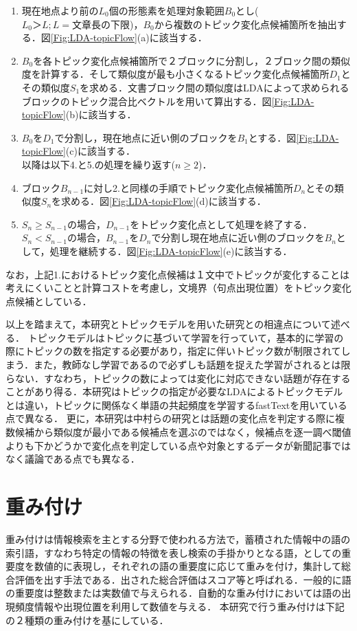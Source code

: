 \begin{enumerate}
  \item 現在地点より前の$L_0$個の形態素を処理対象範囲$B_0$とし($L_0＞L;L=文章長の下限$)，$B_0$から複数のトピック変化点候補箇所を抽出する．図\ref{Fig:LDA-topicFlow}(a)に該当する．
  \item $B_0$を各トピック変化点候補箇所で２ブロックに分割し，２ブロック間の類似度を計算する．そして類似度が最も小さくなるトピック変化点候補箇所$D_1$とその類似度$S_1$を求める．文書ブロック間の類似度はLDAによって求められるブロックのトピック混合比ベクトルを用いて算出する．図\ref{Fig:LDA-topicFlow}(b)に該当する．
  \item $B_0$を$D_1$で分割し，現在地点に近い側のブロックを$B_1$とする．図\ref{Fig:LDA-topicFlow}(c)に該当する．
  \\
  以降は以下4.と5.の処理を繰り返す($n\geq2$)．
  \item ブロック$B_{n-1}$に対し2.と同様の手順でトピック変化点候補箇所$D_n$とその類似度$S_n$を求める．図\ref{Fig:LDA-topicFlow}(d)に該当する．
  \item $S_n \geq S_{n-1}$の場合，$D_{n-1}$をトピック変化点として処理を終了する．$S_n <  S_{n-1}$の場合，$B_{n-1}$を$D_n$で分割し現在地点に近い側のブロックを$B_n$として，処理を継続する．図\ref{Fig:LDA-topicFlow}(e)に該当する．
\end{enumerate}
なお，上記1.におけるトピック変化点候補は１文中でトピックが変化することは考えにくいことと計算コストを考慮し，文境界（句点出現位置）をトピック変化点候補としている．

以上を踏まえて，本研究とトピックモデルを用いた研究との相違点について述べる．
トピックモデルはトピックに基づいて学習を行っていて，基本的に学習の際にトピックの数を指定する必要があり，指定に伴いトピック数が制限されてしまう．また，教師なし学習であるので必ずしも話題を捉えた学習がされるとは限らない．すなわち，トピックの数によっては変化に対応できない話題が存在することがあり得る．本研究はトピックの指定が必要なLDAによるトピックモデルとは違い，トピックに関係なく単語の共起頻度を学習するfastTextを用いている点で異なる．
更に，本研究は中村らの研究とは話題の変化点を判定する際に複数候補から類似度が最小である候補点を選ぶのではなく，候補点を逐一調べ閾値よりも下かどうかで変化点を判定している点や対象とするデータが新聞記事ではなく議論である点でも異なる．
\section{重み付け}
\label{rel:part:weight}
重み付けは情報検索を主とする分野で使われる方法で，蓄積された情報中の語の索引語，すなわち特定の情報の特徴を表し検索の手掛かりとなる語，としての重要度を数値的に表現し，それぞれの語の重要度に応じて重みを付け，集計して総合評価を出す手法である．出された総合評価はスコア等と呼ばれる．一般的に語の重要度は整数または実数値で与えられる．自動的な重み付けにおいては語の出現頻度情報や出現位置を利用して数値を与える．
本研究で行う重み付けは下記の２種類の重み付けを基にしている．
